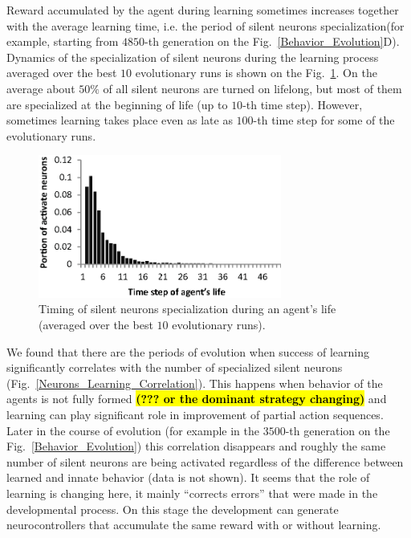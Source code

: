 \documentclass[letterpaper]{article}
\begin{document}
Reward accumulated by the agent during learning sometimes increases together with the average learning time, i.e. the period of silent neurons specialization(for example, starting from $4850$-th generation on the Fig.~\ref{Behavior_Evolution}D). Dynamics of the specialization of silent neurons during the learning process averaged over the best $10$ evolutionary runs is shown on the Fig.~\ref{Activations_dynamics}. On the average about $50\%$ of all silent neurons are turned on lifelong, but most of them are specialized at the beginning of life (up to $10$-th time step). However, sometimes learning takes place even as late as $100$-th time step for some of the evolutionary runs.  

\begin{figure} %
	\begin{center}
	\includegraphics[width=8cm]{Fig4.eps}
	\caption{Timing of silent neurons specialization during an agent's life (averaged over the best $10$ evolutionary runs).}
	\label{Activations_dynamics}
	\end{center}
\end{figure}

We found that there are the periods of evolution when success of learning significantly correlates with the number of specialized silent neurons (Fig.~\ref{Neurons_Learning_Correlation}). This happens when behavior of the agents is not fully formed \textbf{\hl{(??? or the dominant strategy changing)}} and learning can play significant role in improvement of partial action sequences. Later in the course of evolution (for example in the $3500$-th generation on the Fig.~\ref{Behavior_Evolution}) this correlation disappears and roughly the same number of silent neurons are being activated regardless of the difference between learned and innate behavior (data is not shown). It seems that the role of learning is changing here, it mainly ``corrects errors'' that were made in the developmental process. On this stage the development can generate neurocontrollers that accumulate the same reward with or without learning. 
\end{document}
